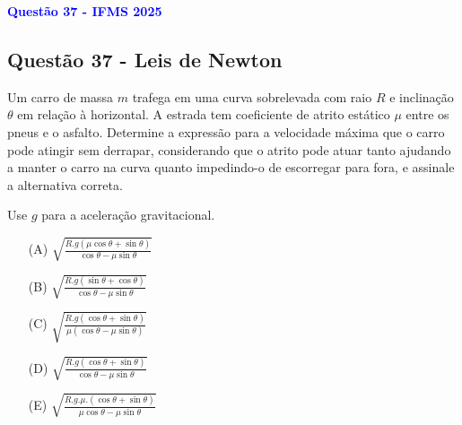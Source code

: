 \begin{flushleft}
\textbf{\textcolor{blue}{\Large Quest\~ao 37 - IFMS 2025}}\\
\subsection{Quest\~ao 37 - Leis de Newton}
Um carro de massa \( m \) trafega em uma curva sobrelevada com raio \( R \) e inclinação \(\theta\) em relação à horizontal. 
A estrada tem coeficiente de atrito estático \(\mu\) entre os pneus e o asfalto. Determine a expressão para a velocidade 
máxima que o carro pode atingir sem derrapar, considerando que o atrito pode atuar tanto ajudando a manter o carro na curva 
quanto impedindo-o de escorregar para fora, e assinale a alternativa correta.

Use \( g \) para a aceleração gravitacional.

\begin{itemize}
\item[(A)] $\sqrt{\frac{R.g\left(\mu\cos\theta +\sin\theta\right)}{\cos\theta - \mu\sin\theta}}$
\item[(B)] $\sqrt{\frac{R.g\left(\sin\theta + \cos\theta\right)}{\cos\theta - \mu\sin\theta}}$  
\item[(C)] $\sqrt{\frac{R.g\left(\cos\theta +\sin\theta\right)}{\mu\left(\cos\theta - \mu\sin\theta\right)}}$
\item[(D)] $\sqrt{\frac{R.g\left(\cos\theta +\sin\theta\right)}{\cos\theta - \mu\sin\theta}}$
\item[(E)] $\sqrt{\frac{R.g.\mu.\left(\cos\theta +\sin\theta\right)}{\mu\cos\theta - \mu\sin\theta}}$
\end{itemize}

\vspace{0.5cm}

\begin{center}
\end{center}
\end{flushleft}

